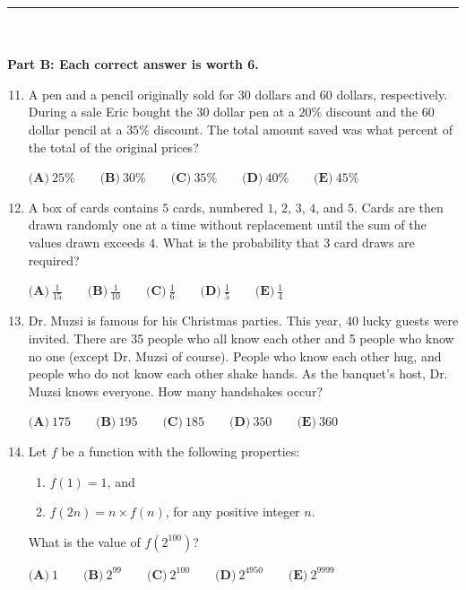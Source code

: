 \documentclass[12pt]{article}
\begin{document}
\par\noindent\rule[0.5]{\textwidth}{1pt}
\\\\\textbf{Part B: Each correct answer is worth 6.}
    \begin{enumerate}
        \setcounter{enumi}{10}
    \item A pen and a pencil originally sold for $30$ dollars and $60$ dollars, respectively. During a sale Eric bought the $30$ dollar pen at a $20\%$ discount and the $60$ dollar pencil at a $35\%$ discount. The total amount saved was what percent of the total of the original prices?
    
    $\textbf{(A)}\ 25\% \qquad \textbf{(B)}\ 30\% \qquad \textbf{(C)}\ 35\% \qquad \textbf{(D)}\ 40\% \qquad \textbf{(E)}\ 45\%$
    
    \item A box of cards contains $5$ cards, numbered $1$, $2$, $3$, $4$, and $5$. Cards are then drawn randomly one at a time without replacement until the sum of the values drawn exceeds $4$. What is the probability that $3$ card draws are required?
    
     $\textbf{(A)}\ \frac{1}{15} \qquad \textbf{(B)}\ \frac{1}{10} \qquad \textbf{(C)}\ \frac{1}{6} \qquad \textbf{(D)}\ \frac{1}{5} \qquad \textbf{(E)}\ \frac{1}{4}$
    
     \item Dr. Muzsi is famous for his Christmas parties. This year, 40 lucky guests were invited. There are 35 people who all know each other and 5 people who know no one (except Dr. Muzsi of course). People who know each other hug, and people who do not know each other shake hands. As the banquet's host, Dr. Muzsi knows everyone. How many handshakes occur?
     
    $\textbf{(A)}\ 175 \qquad \textbf{(B)}\ 195 \qquad \textbf{(C)}\ 185\qquad \textbf{(D)}\ 350\qquad \textbf{(E)}\ 360$
        
     \item Let $f$ be a function with the following properties:
    \begin{enumerate}
        \item $f(1) = 1$, and
        \item $f(2n) = n\times f(n)$, for any positive integer $n$.
    \end{enumerate}
    What is the value of $f(2^{100})$?

    $\textbf{(A)}\ 1 \qquad \textbf{(B)}\ 2^{99} \qquad \textbf{(C)}\ 2^{100} \qquad \textbf{(D)}\ 2^{4950} \qquad \textbf{(E)}\ 2^{9999}$
        

\end{enumerate}
\end{document}
